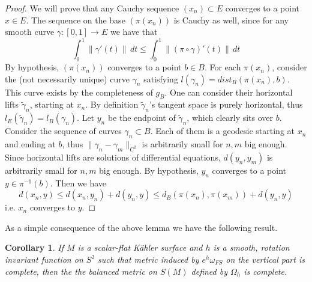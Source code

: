 \documentclass[11pt]{amsart}
\theoremstyle{definition}
\theoremstyle{plain}
\theoremstyle{definition}
\theoremstyle{plain}
\theoremstyle{remark}
\theoremstyle{plain}
\newtheorem{Corollary}[Def]{Corollary}
\begin{document}
    \begin{proof}
        We will prove that any Cauchy sequence $(x_n)\subset E$ converges to a point $x\in E$. The sequence on the base $(\pi(x_n))$ is Cauchy as well, since for any smooth curve $\gamma: [0,1]\to E$ we have that 
        \[
        \int_0^1 \| \gamma'(t)\| \, dt \leq \int_0^1 \| (\pi\circ \gamma)'(t)\| \, dt
        \]
        By hypothesis, $(\pi(x_n))$ converges to a point $b\in B$. 
     For each $\pi(x_n)$, consider the (not necessarily unique) curve $\gamma_n$  satisfying  $l(\gamma_n)=dist_B(\pi(x_n),b)$. This curve exists by the completeness of $g_B$. One can consider their horizontal lifts $\tilde{\gamma}_n$, starting at $x_n$. By definition $\tilde{\gamma}_n$'s tangent space is purely horizontal, thus $l_E(\tilde{\gamma}_n)=l_B({\gamma}_n)$. Let $y_n$ be the endpoint of $\tilde{\gamma}_n$, which clearly sits over $b$. Consider the sequence of curves $\gamma_n \subset B$. Each of them is a geodesic starting at  $x_n$ and ending at $b$, thus $\| \gamma_n -\gamma_m \|_{C^2}$ is arbitrarily small for $n,m$ big enough. Since horizontal lifts are solutions of differential equations, $d(y_n, y_m)$ is arbitrarily small for $n,m$ big enough. By hypothesis, $y_n$ converges to a point $y\in \pi^{-1}(b)$. Then we have
        \[
        d(x_n, y) \leq d(x_n, y_n)+ d(y_n, y) \leq d_B(\pi(x_n), \pi(x_m)) + d(y_n, y)
        \]
        i.e. $x_n$ converges to $y$.

    \end{proof}
  
As a simple consequence of the  above lemma we have  the following result.
  
\begin{Corollary} \label{Cor-completness} 
If $M$ is  a scalar-flat K\"ahler surface and $h$ is a  smooth, rotation
invariant function  on $S^2$ such that   metric induced by $e^h \omega_{FS}$ on the  vertical part is complete,  then the the balanced metric on $S(M)$  defined by $\Omega_h$ is complete.
\end{Corollary}
  
\end{document}
